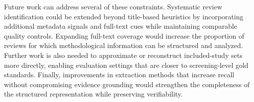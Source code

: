 Future work can address several of these constraints. Systematic review identification could be extended beyond title-based heuristics by incorporating additional metadata signals and full-text cues while maintaining comparable quality controls. Expanding full-text coverage would increase the proportion of reviews for which methodological information can be structured and analyzed. Further work is also needed to approximate or reconstruct included-study sets more directly, enabling evaluation settings that are closer to screening-level gold standards. Finally, improvements in extraction methods that increase recall without compromising evidence grounding would strengthen the completeness of the structured representation while preserving verifiability.



